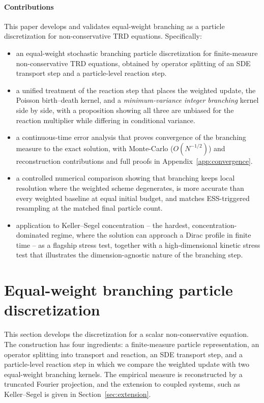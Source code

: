 \documentclass[a4paper,fleqn]{cas-sc}
\theoremstyle{definition}
\theoremstyle{remark}
\begin{document}
\paragraph{Contributions}
This paper develops and validates equal-weight branching as a particle discretization for non-conservative
TRD equations. Specifically:
\begin{itemize}
\item[(i)] an equal-weight stochastic branching particle discretization for finite-measure non-conservative
TRD equations, obtained by operator splitting of an SDE transport step and a particle-level reaction step.
\item[(ii)] a unified treatment of the reaction step that places the weighted update, the Poisson
birth--death kernel, and a \emph{minimum-variance integer branching} kernel side by side, with a proposition
showing all three are unbiased for the reaction multiplier while differing in conditional variance.
\item[(iii)] a continuous-time error analysis that proves convergence of the branching measure to the exact
solution, with Monte-Carlo ($O(N^{-1/2})$) and reconstruction contributions and full proofs in
Appendix~\ref{app:convergence}.
\item[(iv)] a controlled numerical comparison showing that branching keeps local
resolution where the weighted scheme degenerates, is more accurate than every weighted baseline at equal
initial budget, and matches ESS-triggered resampling at the matched final particle count.
\item[(v)] application to Keller--Segel concentration -- the hardest, concentration-dominated regime, where the
solution can approach a Dirac profile in finite time -- as a flagship stress test, together with a
high-dimensional kinetic stress test that illustrates the dimension-agnostic nature of the branching step.
\end{itemize}



\section{Equal-weight branching particle discretization}
\label{sec:method}
This section develops the discretization for a scalar non-conservative equation. The construction has four
ingredients: a finite-measure particle representation, an operator splitting into
transport and reaction, an SDE transport step, and a particle-level reaction step in which we compare the weighted
update with two equal-weight branching kernels. The empirical measure is
reconstructed by a truncated Fourier projection, and the extension to coupled
systems, such as Keller--Segel is given in Section~\ref{sec:extension}.
\end{document}
